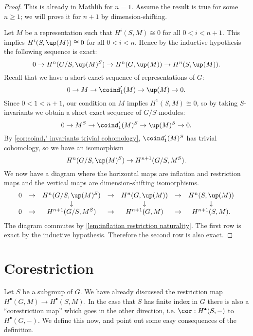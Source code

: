 \begin{proof}
	This is already in Mathlib for $n=1$.
	Assume the result is true for some $n\ge 1$; we will prove it for $n+1$
	by dimension-shifting.

	Let $M$ be a representation such that $H^i(S,M)\cong 0$ for all $0 < i < n+1$.
	This implies $H^i(S,\up(M)) \cong 0$ for all $0 < i < n$.
	Hence by the inductive hypothesis the following sequence is exact:
	\[
		0 \to H^n( G/S, \up(M)^S) \to H^n(G, \up(M)) \to H^n(S,\up(M)).
	\]
	Recall that we have a short exact sequence of representations of $G$:
	\[
		0 \to M \to \coind_1'(M) \to \up(M) \to 0.
	\]
	Since $0 < 1 < n+1$, our condition on $M$ implies $H^1(S,M) \cong 0$,
	so by taking $S$-invariants we obtain a short exact sequence of
	$G/S$-modules:
	\[
		0 \to M^S \to \coind_1'(M)^S \to \up(M)^S \to 0.
	\]
	By \ref{cor:coind₁' invariants trivial cohomology}, $\coind_1'(M)^S$ has trivial cohomology,
	so we have an isomorphism
	\[
		 H^n(G/S, \up(M)^S) \to H^{n+1}(G/S, M^S).
	\]
	We now have a diagram where the horizontal maps are inflation and restriction maps
	and the vertical maps are dimension-shifting isomorphisms.
	\[
		\begin{matrix}
			0 &\to& H^{n}(G/S, \up(M)^S) &\to &H^{n}(G,\up(M)) & \to & H^n(S,\up(M)) \\
			  &   &   \downarrow              &    &  \downarrow         &     &  \downarrow  \\
			0 &\to& H^{n+1}(G/S, M^S) &\to &H^{n+1}(G,M) & \to & H^{n+1}(S,M).
		\end{matrix}
	\]
	The diagram commutes by \ref{lem:inflation restriction naturality}.
	The first row is exact by the inductive hypothesis.
	Therefore the second row is also exact.
\end{proof}




\section{Corestriction}

Let $S$ be a subgroup of $G$. We have already discussed the restriction map
$H^\bullet(G,M) \to H^\bullet(S,M)$.
In the case that $S$ has finite index in $G$ there is also a ``corestriction map'' which
goes in the other direction, i.e. $\cor : H^\bullet (S,-)$ to $H^\bullet(G,-)$.
We define this now, and point out some easy consequences of the definition.

